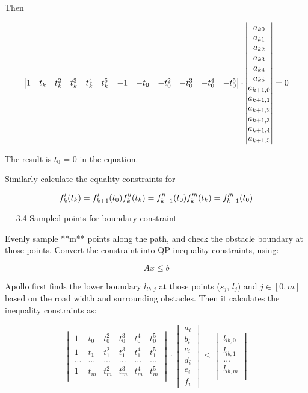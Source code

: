 \documentclass[a4paper,11pt]{article}  %
\begin{document}
Then

$$
\addtocounter{MaxMatrixCols}{10}
\begin{vmatrix} 
 1 & t_k & t_k^2 & t_k^3 & t_k^4&t_k^5 &  -1 & -t_{0} & -t_{0}^2 & -t_{0}^3 & -t_{0}^4&-t_{0}^5\\
 \end{vmatrix} 
 \cdot 
 \begin{vmatrix} 
 a_{k0} \\ a_{k1} \\ a_{k2} \\ a_{k3} \\ a_{k4} \\ a_{k5} \\ a_{k+1,0} \\ a_{k+1,1} \\ a_{k+1,2} \\ a_{k+1,3} \\ a_{k+1,4} \\ a_{k+1,5}   
 \end{vmatrix} 
 = 0
$$

The result is $t_0$ = 0 in the equation.

Similarly calculate the equality constraints for 

$$
f'_k(t_k) = f'_{k+1} (t_0)
\\
f''_k(t_k) = f''_{k+1} (t_0)
\\
f'''_k(t_k) = f'''_{k+1} (t_0)
$$


--- 3.4  Sampled points for boundary constraint

Evenly sample **m** points along the path, and check the obstacle boundary at those points.  Convert the constraint into QP inequality constraints, using:

$$
Ax \leq b
$$

Apollo first finds the lower boundary $l_{lb,j}$ at those points ($s_j$, $l_j$) and  $j\in[0, m]$ based on the road width and surrounding obstacles. Then it calculates the inequality constraints as:

$$
\begin{vmatrix} 
 1 & t_0 & t_0^2 & t_0^3 & t_0^4&t_0^5 \\
  1 & t_1 & t_1^2 & t_1^3 & t_1^4&t_1^5 \\
 ...&...&...&...&...&... \\
 1 & t_m & t_m^2 & t_m^3 & t_m^4&t_m^5 \\
 \end{vmatrix} \cdot \begin{vmatrix} a_i \\ b_i \\ c_i \\ d_i \\ e_i \\ f_i \end{vmatrix} 
 \leq 
 \begin{vmatrix}
 l_{lb,0}\\
 l_{lb,1}\\
 ...\\
 l_{lb,m}\\
 \end{vmatrix}
$$
\end{document}
